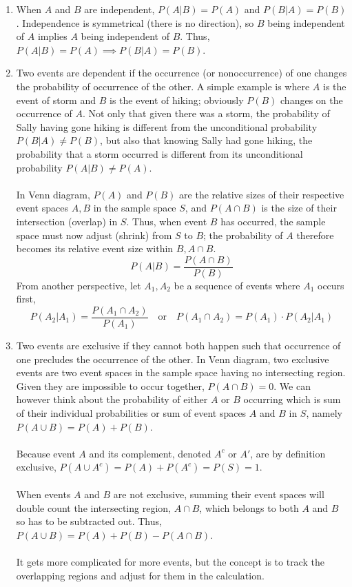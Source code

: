 \documentclass[12pt]{article}
\begin{document}
\begin{enumerate}
\item
When $A$ and $B$ are independent, $P(A | B) = P(A)$ and $P(B|A) = P(B)$. Independence is symmetrical (there is no direction), so $B$ being independent of $A$ implies $A$ being independent of $B$.
Thus, $P(A | B) = P(A) \implies P(B|A) = P(B)$.

\item 
Two events are dependent if the occurrence (or nonoccurrence) of one changes the probability of occurrence of the other. A simple example is where $A$ is the event of storm and $B$ is the event of hiking; obviously $P(B)$ changes on the occurrence of $A$.
Not only that given there was a storm, the probability of Sally having gone hiking is different from the unconditional probability $P(B|A) \neq P(B)$, but also that knowing Sally had gone hiking, the probability that a storm occurred is different from its unconditional probability $P(A|B) \neq P(A)$.
\\\\
In Venn diagram, $P(A)$ and $P(B)$ are the relative sizes of their respective event spaces $A, B$ in the sample space $S$, and $P(A \cap B)$ is the size of their intersection (overlap) in $S$. 
Thus, when event $B$ has occurred, the sample space must now adjust (shrink) from $S$ to $B$; the probability of $A$ therefore becomes its relative event size within $B, A \cap B$.
$$
P(A|B) = \frac{P(A \cap B)}{P(B)}
$$
From another perspective, let $A_1, A_2$ be a sequence of events where $A_1$ occurs first, 
$$
P(A_2 | A_1) = \frac{P(A_1 \cap A_2)}{P(A_1)} \quad \text{or} \quad P(A_1 \cap A_2) = P(A_1) \cdot P(A_2 | A_1)
$$

\item
Two events are exclusive if they cannot both happen such that occurrence of one precludes the occurrence of the other. 
In Venn diagram, two exclusive events are two event spaces in the sample space having no intersecting region. 
Given they are impossible to occur together, $P(A \cap B) = 0$. 
We can however think about the probability of either $A$ or $B$ occurring which is sum of their individual probabilities or sum of event spaces $A$ and $B$ in $S$, namely $P(A \cup B) = P(A) + P(B)$.
\\\\
Because event $A$ and its complement, denoted $A^c$ or $A'$, are by definition exclusive, $P(A \cup A^c) = P(A) + P(A^c) = P(S) = 1$.
\\\\
When events $A$ and $B$ are not exclusive, summing their event spaces will double count the intersecting region, $A \cap B$, which belongs to both $A$ and $B$ so has to be subtracted out. 
Thus, $P(A \cup B) = P(A) + P(B) - P(A \cap B)$.
\\\\
It gets more complicated for more events, but the concept is to track the overlapping regions and adjust for them in the calculation.



\end{enumerate}
\end{document}
